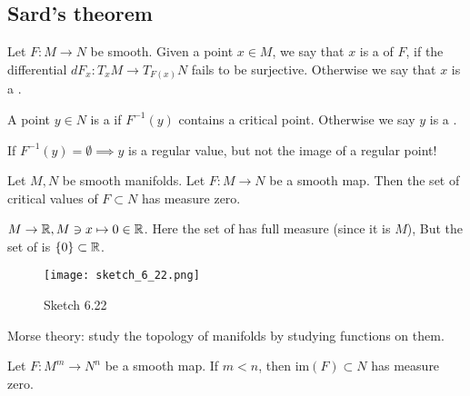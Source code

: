 \subsection{Sard's theorem}

\begin{definition*}
    Let \(F:M\to N\) be smooth. Given a point \(x\in M\), we say that \(x\) is a  
    of \(F\), if the differential  \(dF_x:T_xM\to T_{F(x)}N\) fails to be surjective. Otherwise 
    we say that \(x\) is a .
    
    A point \(y\in N\) is a  if \(F^{-1}(y)\) contains a 
    critical point. Otherwise we say \(y\) is a . 
\end{definition*}

\begin{remark}
    If \(F^{-1}(y)=\emptyset\implies y\) is a regular value, but not the image of a regular point!
\end{remark}

\begin{theorem}[Sard]\label{thm:6.9:Sard}
    Let \(M,N\) be smooth manifolds. Let \(F:M\to N\) be a smooth map. Then 
    the set of critical values of \(F\subset N\) has measure zero. 
\end{theorem}

\begin{example}
    \(M\to\mathbb{R}, M\ni x\mapsto 0\in\mathbb{R}\). Here the set of  has full measure (since it is \(M\)),
    But the set of  is \(\{0\}\subset\mathbb{R}\).
\end{example}

\begin{example}
    \begin{figure}[H]\label{fig:6.22} %
        \centering
        \texttt{[image: sketch\_6\_22.png]}
        \caption{Sketch 6.22}
    \end{figure}
    Morse theory: study  the topology of manifolds by studying functions on them.
\end{example}

\begin{corollary}\label{cor:6.10}
    Let \(F:M^m\to N^n\) be a smooth map. If \(m<n\), then 
    \(\text{im}(F)\subset N\) has measure zero. 
\end{corollary}

